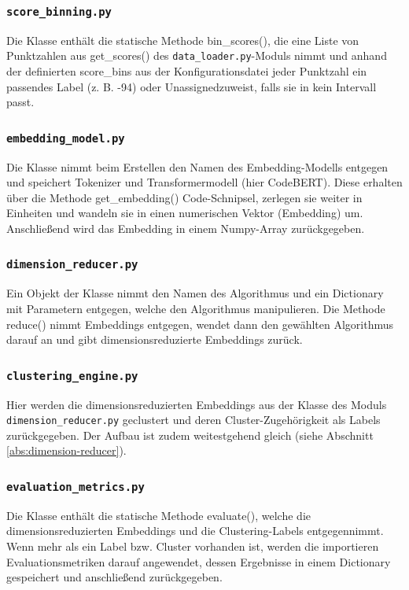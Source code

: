 \subsubsection*{\texttt{score\_binning.py}}
\label{abs:score-binning}
Die Klasse enthält die statische Methode bin\_scores(), die eine Liste von Punktzahlen aus get\_scores() des \texttt{data\_loader.py}-Moduls nimmt und anhand der definierten score\_bins aus der Konfigurationsdatei jeder Punktzahl ein passendes Label (z. B. -94\grqq) oder \glqq Unassigned\grqq zuweist, falls sie in kein Intervall passt.


\subsubsection*{\texttt{embedding\_model.py}}
\label{abs:embedding-model}
Die Klasse nimmt beim Erstellen den Namen des Embedding-Modells entgegen und speichert Tokenizer und Transformermodell (hier CodeBERT). Diese erhalten über die Methode get\_embedding() Code-Schnipsel, zerlegen sie weiter in Einheiten und wandeln sie in einen numerischen Vektor (Embedding) um. Anschließend wird das Embedding in einem Numpy-Array zurückgegeben.


\subsubsection*{\texttt{dimension\_reducer.py}}
\label{abs:dimension-reducer}
Ein Objekt der Klasse nimmt den Namen des Algorithmus und ein Dictionary mit Parametern entgegen, welche den Algorithmus manipulieren. Die Methode reduce() nimmt Embeddings entgegen, wendet dann den gewählten Algorithmus darauf an und gibt dimensionsreduzierte Embeddings zurück.


\subsubsection*{\texttt{clustering\_engine.py}}
\label{abs:clustering-engine}
Hier werden die dimensionsreduzierten Embeddings aus der Klasse des Moduls \texttt{dimension\_reducer.py} geclustert und deren Cluster-Zugehörigkeit als Labels zurückgegeben. Der Aufbau ist zudem weitestgehend gleich (siehe Abschnitt \ref{abs:dimension-reducer}).


\subsubsection*{\texttt{evaluation\_metrics.py}}
\label{abs:evaluation-metrics}
Die Klasse enthält die statische Methode evaluate(), welche die dimensionsreduzierten Embeddings und die Clustering-Labels entgegennimmt. Wenn mehr als ein Label bzw. Cluster vorhanden ist, werden die importieren Evaluationsmetriken darauf angewendet, dessen Ergebnisse in einem Dictionary gespeichert und anschließend zurückgegeben.



